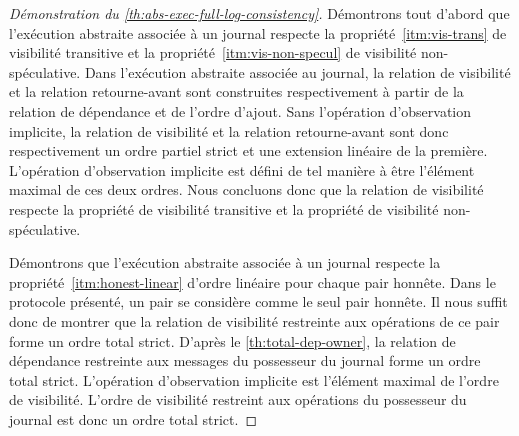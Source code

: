 \begin{proof}[Démonstration du \autoref{th:abs-exec-full-log-consistency}]
Démontrons tout d'abord que l'exécution abstraite associée à un journal respecte la propriété~\ref{itm:vis-trans} de visibilité transitive et la propriété~\ref{itm:vis-non-specul} de visibilité non-spéculative.
Dans l'exécution abstraite associée au journal, la relation de visibilité et la relation retourne-avant sont construites respectivement à partir de la relation de dépendance et de l'ordre d'ajout.
Sans l'opération d'observation implicite, la relation de visibilité et la relation retourne-avant sont donc respectivement un ordre partiel strict et une extension linéaire de la première.
L'opération d'observation implicite est défini de tel manière à être l'élément maximal de ces deux ordres.
Nous concluons donc que la relation de visibilité respecte la propriété de visibilité transitive et la propriété de visibilité non-spéculative.

Démontrons que l'exécution abstraite associée à un journal respecte la propriété~\ref{itm:honest-linear} d'ordre linéaire pour chaque pair honnête.
Dans le protocole présenté, un pair se considère comme le seul pair honnête.
Il nous suffit donc de montrer que la relation de visibilité restreinte aux opérations de ce pair forme un ordre total strict.
D'après le \autoref{th:total-dep-owner}, la relation de dépendance restreinte aux messages du possesseur du journal forme un ordre total strict.
L'opération d'observation implicite est l'élément maximal de l'ordre de visibilité.
L'ordre de visibilité restreint aux opérations du possesseur du journal est donc un ordre total strict.


\end{proof}
